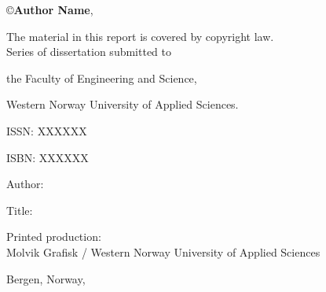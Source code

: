 \documentclass[12pt]{book} %
\title{
    {\fontsize{20}{24}{\color{Maroon}\spaceduppercaps{Thesis Title Goes Here }}}
	\author{
        \textbf{Doctoral Dissertation by}\\ 
        \textbf{Author Name}\vspace{0.5cm}\\
		Thesis submitted for\\ 
        the degree of Philosophiae Doctor (PhD)\\
        in\\ 
        Computer Science:\\
        {\fontsize{12}{14}Software Engineering, Sensor Networks and Engineering Computing}\vspace{0.5cm}\\
		\texttt{[image: logos/logo.pdf]}\vspace{0.5cm}\\
        Department of Computer Science,\\ 
		Electrical Engineering and Mathematical Sciences\vspace{0.3cm}\\
		Faculty of Engineering and Science \vspace{0.3cm}\\
		Western Norway University of Applied Sciences
	}
	\date{Month day, year}
}
\begin{document}
\newcommand{\TextSize}{13}
\newcommand{\BaseLineSkip}{15}
\fontsize{\TextSize}{\BaseLineSkip}
\selectfont

\cleardoublepage
\maketitle
\thispagestyle{empty}

\normalsize\vspace*{12cm}
\begin{minipage}{13cm}

\copyright{\textbf{Author Name}}, \textbf{ \the\year{}}\vspace{2ex}  %

The material in this report is covered by copyright law.\vspace{3ex}\\

Series of dissertation submitted to

the Faculty of Engineering and Science,

Western Norway University of Applied Sciences.\vspace{3ex}

ISSN: XXXXXX 			 %

ISBN: XXXXXX\vspace{3ex} %


Author: 

Title: \vspace{4ex}

Printed production: \\
Molvik Grafisk / Western Norway University of Applied Sciences \vspace{3ex}

Bergen, Norway, \the\year{}
\end{minipage}

\ifDraftMargin
\fi
\end{document}
